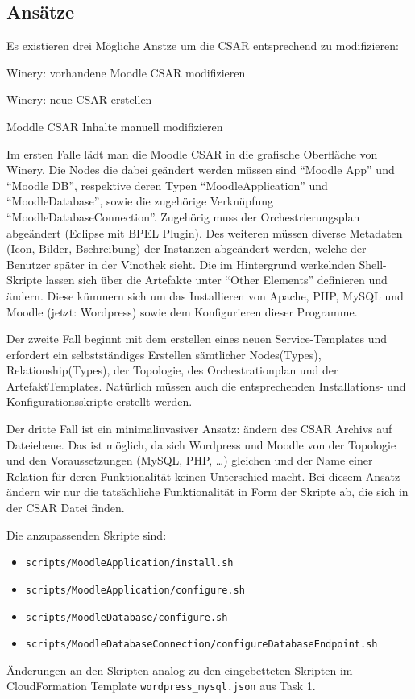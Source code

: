 

\subsection{Ansätze}

Es existieren drei Mögliche Anstze um die CSAR entsprechend zu modifizieren:
\begin{enumeration}
    \item Winery: vorhandene Moodle CSAR modifizieren
    \item Winery: neue CSAR erstellen
    \item Moddle CSAR Inhalte manuell modifizieren
\end{enumeration}

Im ersten Falle lädt man die Moodle CSAR in die grafische Oberfläche von Winery.
Die Nodes die dabei geändert werden müssen sind \enquote{Moodle App} und \enquote{Moodle DB}, respektive deren Typen \enquote{MoodleApplication} und \enquote{MoodleDatabase}, sowie die zugehörige Verknüpfung \enquote{MoodleDatabaseConnection}.
Zugehörig muss der Orchestrierungsplan abgeändert (Eclipse mit BPEL Plugin).
Des weiteren müssen diverse Metadaten (Icon, Bilder, Bschreibung) der Instanzen abgeändert werden, welche der Benutzer später in der Vinothek sieht.
Die im Hintergrund werkelnden Shell-Skripte lassen sich über die Artefakte unter \enquote{Other Elements} definieren und ändern. Diese kümmern sich um das Installieren von Apache, PHP, MySQL und Moodle (jetzt: Wordpress) sowie dem Konfigurieren dieser Programme.

Der zweite Fall beginnt mit dem erstellen eines neuen Service-Templates und erfordert ein selbstständiges Erstellen sämtlicher Nodes(Types), Relationship(Types), der Topologie, des Orchestrationplan und der ArtefaktTemplates.
Natürlich müssen auch die entsprechenden Installations- und Konfigurationsskripte erstellt werden.

Der dritte Fall ist ein minimalinvasiver Ansatz: ändern des CSAR Archivs auf Dateiebene.
Das ist möglich, da sich Wordpress und Moodle von der Topologie und den Voraussetzungen (MySQL, PHP, \ldots) gleichen und der Name einer Relation für deren Funktionalität keinen Unterschied macht.
Bei diesem Ansatz ändern wir nur die tatsächliche Funktionalität in Form der Skripte ab, die sich in der CSAR Datei finden.

Die anzupassenden Skripte sind:
\begin{itemize}
    \item \texttt{scripts/MoodleApplication/install.sh}
    \item \texttt{scripts/MoodleApplication/configure.sh}
    \item \texttt{scripts/MoodleDatabase/configure.sh}
    \item \texttt{scripts/MoodleDatabaseConnection/configureDatabaseEndpoint.sh}
\end{itemize}
Änderungen an den Skripten analog zu den eingebetteten Skripten im CloudFormation Template \texttt{wordpress_mysql.json} aus Task 1.

